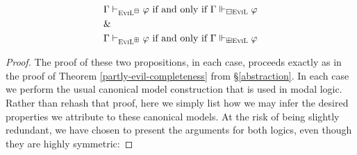 \begin{theorem}
\begin{eqnarray*}
& \Gamma \vdash_{\textsc{EviL}^\boxminus} \varphi\textup{ if and only if }\Gamma
\Vdash_{\boxminus\textup{\textsc{EviL}}} \varphi \\
& \& \\
& \Gamma \vdash_{\textsc{EviL}^\boxplus} \varphi\textup{ if and only if }\Gamma
\Vdash_{\boxplus\textup{\textsc{EviL}}} \varphi 
\end{eqnarray*}
\end{theorem}
\begin{proof}
  The proof of these two propositions, in each case, proceeds exactly as in the proof of Theorem
  \ref{partly-evil-completeness} from \S\ref{abstraction}. In each
  case we perform the usual canonical model construction that is used
  in modal logic.  
  Rather than rehash that proof, here
  we simply list how we may infer the desired properties we attribute
  to these canonical models.  At the risk of being slightly redundant, we have chosen to
  present the arguments for both logics, even though they are highly symmetric:


\end{proof}
